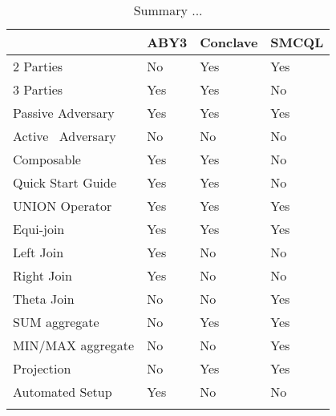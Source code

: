 \begin{table}
	\label{Summary}	
	\centering
	\caption{Summary ...}
	\begin{tabular}{|l|l|l|l|} 
		\hline
		& ABY3                 & Conclave             & SMCQL                 \\ 
		\hline
		2 Parties            & No                   & Yes                  & Yes                   \\ 
		\hline
		3 Parties            & Yes                  & Yes                  & No                    \\ 
		\hline
		Passive Adversary    & Yes                  & Yes                  & Yes                   \\ 
		\hline
		Active~ Adversary    & No                   & No                   & No                    \\ 
		\hline
		Composable           & Yes                  & Yes                  & No                    \\ 
		\hline
		Quick Start Guide    & Yes                  & Yes                  & No                    \\ 
		\hline
		UNION Operator       & Yes                  & Yes                  & Yes                   \\ 
		\hline
		Equi-join            & Yes                  & Yes                  & Yes                   \\ 
		\hline
		Left Join            & Yes                  & No                   & No                    \\ 
		\hline
		Right Join           & Yes                  & No                   & No                    \\ 
		\hline
		Theta Join           & No                   & No                   & Yes                   \\ 
		\hline
		SUM aggregate        & No                   & Yes                  & Yes                   \\ 
		\hline
		MIN/MAX aggregate    & No                   & No                   & Yes                   \\ 
		\hline
		Projection           & No                   & Yes                  & Yes                   \\ 
		\hline
		Automated Setup           & Yes                   & No                  & No                   \\ 
		\hline
		
		\multicolumn{1}{l}{} & \multicolumn{1}{l}{} & \multicolumn{1}{l}{} & \multicolumn{1}{l}{} 
	\end{tabular}
\end{table}

